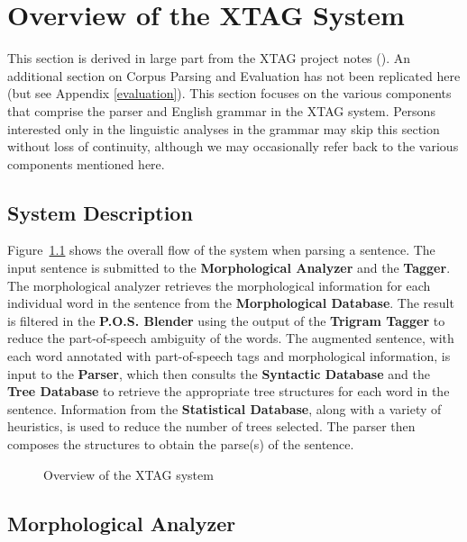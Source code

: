 \chapter{Overview of the XTAG System}
\label{overview}

This section is derived in large part from the XTAG project notes
(\cite{Xtag-notes}).  An additional section on Corpus Parsing and Evaluation
has not been replicated here (but see Appendix \ref{evaluation}). This section
focuses on the various components that comprise the parser and English grammar
in the XTAG system.  Persons interested only in the linguistic analyses in the
grammar may skip this section without loss of continuity, although we may
occasionally refer back to the various components mentioned here.

\section{System Description}

Figure~{\ref{flowchart}} shows the overall flow of the system when parsing a
sentence. The input sentence is submitted to the {\bf Morphological Analyzer}
and the {\bf Tagger}. The morphological analyzer retrieves the morphological
information for each individual word in the sentence from the {\bf
Morphological Database}. The result is filtered in the {\bf P.O.S. Blender}
using the output of the {\bf Trigram Tagger} to reduce the part-of-speech
ambiguity of the words. The augmented sentence, with each word annotated with
part-of-speech tags and morphological information, is input to the {\bf
Parser}, which then consults the {\bf Syntactic Database} and the {\bf Tree
Database} to retrieve the appropriate tree structures for each word in the
sentence.  Information from the {\bf Statistical Database}, along with a
variety of heuristics, is used to reduce the number of trees selected. The
parser then composes the structures to obtain the parse(s) of the sentence.

\begin{figure}[htb]
\centering
\mbox{}
{}
\caption{Overview of the XTAG system}
\label{flowchart}
\end{figure}

\section{Morphological Analyzer}

